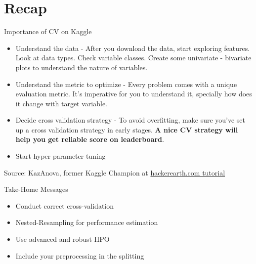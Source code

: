 \documentclass[11pt,compress,t,notes=noshow, xcolor=table]{beamer}
\begin{document}
\section{Recap}

\begin{frame}{Importance of CV on Kaggle}

\begin{itemize}
\setlength\itemsep{1em}
    \item Understand the data - After you download the data, start exploring features. Look at data types. Check variable classes. Create some univariate - bivariate plots to understand the nature of variables.
    \item Understand the metric to optimize - Every problem comes with a unique evaluation metric. It's imperative for you to understand it, specially how does it change with target variable.
    \item Decide cross validation strategy - To avoid overfitting, make sure you've set up a cross validation strategy in early stages. \textbf{A nice CV strategy will help you get reliable score on leaderboard}.
    \item Start hyper parameter tuning 
\end{itemize}

Source: KazAnova, former Kaggle Champion at \href{https://www.hackerearth.com/practice/machine-learning/advanced-techniques/winning-tips-machine-learning-competitions-kazanova-current-kaggle-3/tutorial/}{hackerearth.com tutorial}
\end{frame}

\begin{frame}{Take-Home Messages}
\setlength\itemsep{1em}
    \begin{itemize}
        \item Conduct correct cross-validation
        \item Nested-Resampling for performance estimation
        \item Use advanced and robust HPO
        \item Include your preprocessing in the splitting
    \end{itemize}
\end{frame}

\endlecture
\end{document}
